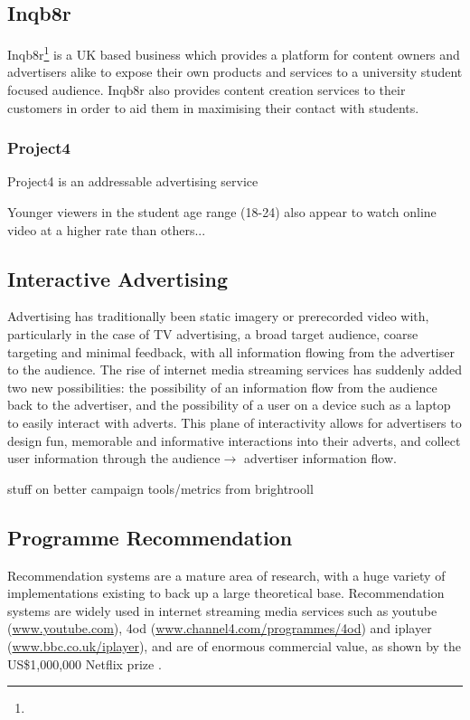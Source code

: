 	\subsection{Inqb8r}

	Inqb8r\footnote{} is a UK based business which provides a platform for content owners and advertisers alike to expose their own products and services to a university student focused audience. Inqb8r also provides content creation services to their customers in order to aid them in maximising their contact with students.

	\subsubsection{Project4}

	Project4 is an addressable advertising service

	Younger viewers in the student age range (18-24) also appear to watch online video at a higher rate than others...


	\subsection{Interactive Advertising}

	Advertising has traditionally been static imagery or prerecorded video with, particularly in the case of TV advertising, a broad target audience, coarse targeting and minimal feedback, with all information flowing from the advertiser to the audience. The rise of internet media streaming services has suddenly added two new possibilities: the possibility of an information flow from the audience back to the advertiser, and the possibility of a user on a device such as a laptop to easily interact with adverts. This plane of interactivity allows for advertisers to design fun, memorable and informative interactions into their adverts, and collect user information through the audience$\rightarrow$ advertiser information flow.

	stuff on better campaign tools/metrics from brightrooll

	\subsection{Programme Recommendation}

	Recommendation systems are a mature area of research, with a huge variety of implementations existing to back up a large theoretical base. Recommendation systems are widely used in internet streaming media services such as youtube (\url{www.youtube.com}), 4od (\url{www.channel4.com/programmes/4od}) and iplayer (\url{www.bbc.co.uk/iplayer}), and are of enormous commercial value, as shown by the US\$1,000,000 Netflix prize \citep{pragmatic_chaos}.

